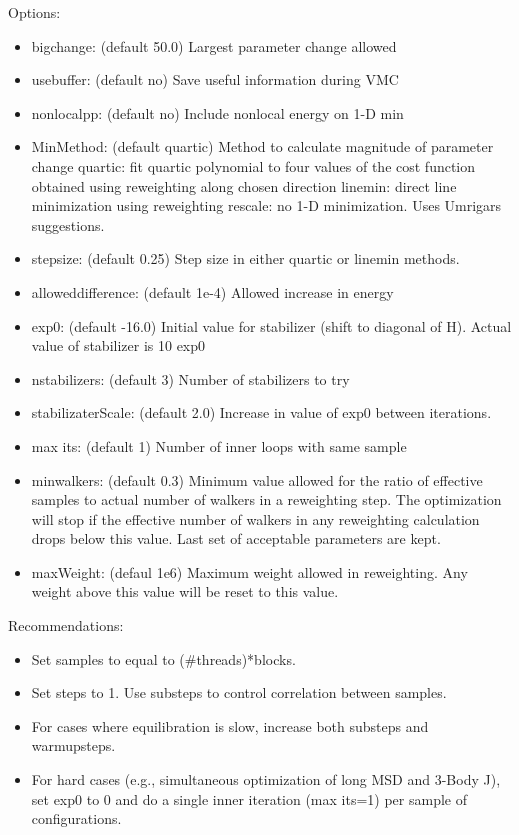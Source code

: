 {Options:
\begin{itemize}
  \item{bigchange: (default 50.0) Largest parameter change allowed}
  \item{usebuffer: (default no) Save useful information during VMC}
  \item{nonlocalpp: (default no) Include nonlocal energy on 1-D min}
  \item{MinMethod: (default quartic) Method to calculate magnitude of parameter change
quartic: fit quartic polynomial to four values of the cost function obtained using reweighting 
along chosen direction linemin: direct line minimization using reweighting rescale:
no 1-D minimization. Uses Umrigars suggestions.}
  \item{stepsize: (default 0.25) Step size in either quartic or linemin methods.}
  \item{alloweddifference: (default 1e-4) Allowed increase in energy}
  \item{exp0: (default -16.0) Initial value for stabilizer (shift to diagonal of H). Actual value
of stabilizer is 10 exp0}
  \item{nstabilizers: (default 3) Number of stabilizers to try}
  \item{stabilizaterScale: (default 2.0) Increase in value of exp0 between iterations.}
  \item{max its: (default 1) Number of inner loops with same sample}
  \item{minwalkers: (default 0.3) Minimum value allowed for the ratio of effective samples
to actual number of walkers in a reweighting step. The optimization will stop if the
effective number of walkers in any reweighting calculation drops below this value. Last
set of acceptable parameters are kept.}
  \item{maxWeight: (defaul 1e6) Maximum weight allowed in reweighting. Any weight above
this value will be reset to this value.}
\end{itemize}

Recommendations:
\begin{itemize}
  \item{Set samples to equal to (\#threads)*blocks.}
  \item{Set steps to 1. Use substeps to control correlation between samples.}
  \item{For cases where equilibration is slow, increase both substeps and warmupsteps.}
  \item{For hard cases (e.g., simultaneous optimization of long MSD and 3-Body J), set exp0
to 0 and do a single inner iteration (max its=1) per sample of configurations.}
\end{itemize}


}
